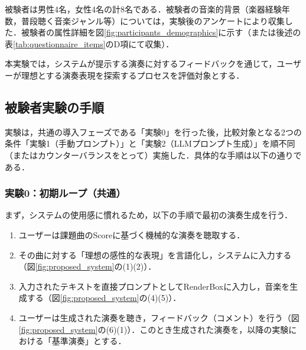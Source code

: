 被験者は男性4名，女性4名の計8名である．被験者の音楽的背景（楽器経験年数，普段聴く音楽ジャンル等）については，実験後のアンケートにより収集した．被験者の属性詳細を図\ref{fig:participants_demographics}に示す（または後述の表\ref{tab:questionnaire_items}のD項にて収集）．


本実験では，システムが提示する演奏に対するフィードバックを通じて，ユーザーが理想とする演奏表現を探索するプロセスを評価対象とする．

\subsection{被験者実験の手順}
\label{subsec:被験者実験の手順}

実験は，共通の導入フェーズである「実験0」を行った後，比較対象となる2つの条件「実験1（手動プロンプト）」と「実験2（LLMプロンプト生成）」を順不同（またはカウンターバランスをとって）実施した．具体的な手順は以下の通りである．

\subsubsection*{実験0：初期ループ（共通）}
まず，システムの使用感に慣れるため，以下の手順で最初の演奏生成を行う．
\begin{enumerate}
    \item ユーザーは課題曲のScoreに基づく機械的な演奏を聴取する．
    \item その曲に対する「理想の感性的な表現」を言語化し，システムに入力する（図\ref{fig:proposed_system}の(1)(2)）．
    \item 入力されたテキストを直接プロンプトとしてRenderBoxに入力し，音楽を生成する（図\ref{fig:proposed_system}の(4)(5)）．
    \item ユーザーは生成された演奏を聴き，フィードバック（コメント）を行う（図\ref{fig:proposed_system}の(6)(1)）．このとき生成された演奏を，以降の実験における「基準演奏」とする．
\end{enumerate}

